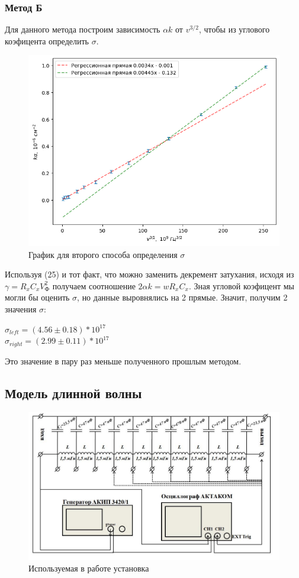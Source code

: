 \documentclass[a4paper,12pt]{article} %
\begin{document}
\subsubsection{Метод Б}
Для данного метода построим зависимость $\alpha k \text{ от }v^{3/2}$, чтобы из углового коэфицента определить $\sigma$.

\begin{figure}[H]
    \centering
    \includegraphics[width=0.7\linewidth]{plot/fig5.png}
    \caption{График для второго способа определения $\sigma$}
\end{figure}

Используя (25) и тот факт, что можно заменить декремент затухания, исходя из $\gamma = R_xC_xV_\text{Ф}^2$ получаем соотношение $2\alpha k = wR_xC_x$. Зная угловой коэфицент мы могли бы оценить $\sigma$, но данные выровнялись на 2 прямые. Значит, получим 2 значения $\sigma$:
\begin{center}
    $\sigma_{left} = (4.56 \pm 0.18) * 10^{17}$\\
    $\sigma_{right} = (2.99 \pm 0.11) * 10^{17}$
\end{center}
Это значение в пару раз меньше полученного прошлым методом.



\subsection{Модель длинной волны}
\begin{figure}[H]
    \centering
    \includegraphics[width=0.7\linewidth]{plot/pic3.png}
    \caption{Используемая в работе установка}
\end{figure}
\end{document}
